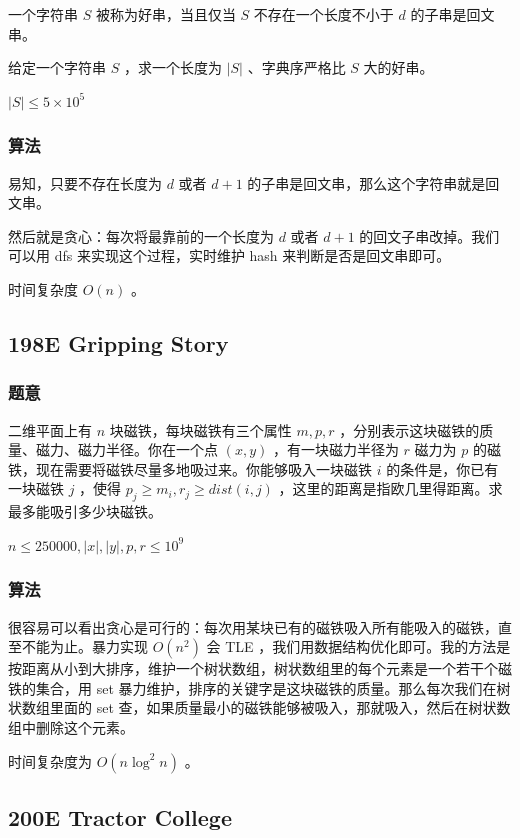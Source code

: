 \documentclass[11pt]{article}
\begin{document}
\begin{definition}
    一个字符串 $S$ 被称为好串，当且仅当 $S$ 不存在一个长度不小于 $d$ 的子串是回文串。
\end{definition}
给定一个字符串 $S$ ，求一个长度为 $|S|$ 、字典序严格比 $S$ 大的好串。

$|S| \leq 5 \times 10^5$
\subsubsection{算法}
\label{sec-11-2-2}

易知，只要不存在长度为 $d$ 或者 $d + 1$ 的子串是回文串，那么这个字符串就是回文串。

然后就是贪心：每次将最靠前的一个长度为 $d$ 或者 $d + 1$ 的回文子串改掉。我们可以用 dfs 来实现这个过程，实时维护 hash 来判断是否是回文串即可。

时间复杂度 $O(n)$ 。
    
\subsection{198E  Gripping Story}
\label{sec-11-3}
\subsubsection{题意}
\label{sec-11-3-1}

    二维平面上有 $n$ 块磁铁，每块磁铁有三个属性 $m, p, r$ ，分别表示这块磁铁的质量、磁力、磁力半径。你在一个点 $(x, y)$ ，有一块磁力半径为 $r$ 磁力为 $p$ 的磁铁，现在需要将磁铁尽量多地吸过来。你能够吸入一块磁铁 $i$ 的条件是，你已有一块磁铁 $j$ ，使得 $p_j \geq m_i, r_j \geq dist (i, j)$ ，这里的距离是指欧几里得距离。求最多能吸引多少块磁铁。

    $n \leq 250000, |x|, |y|, p, r \leq 10^9$ 
\subsubsection{算法}
\label{sec-11-3-2}

    很容易可以看出贪心是可行的：每次用某块已有的磁铁吸入所有能吸入的磁铁，直至不能为止。暴力实现 $O(n^2)$ 会 TLE ，我们用数据结构优化即可。我的方法是按距离从小到大排序，维护一个树状数组，树状数组里的每个元素是一个若干个磁铁的集合，用 set 暴力维护，排序的关键字是这块磁铁的质量。那么每次我们在树状数组里面的 set 查，如果质量最小的磁铁能够被吸入，那就吸入，然后在树状数组中删除这个元素。

    时间复杂度为 $O(n \log^2 n)$ 。
\subsection{200E  Tractor College}
\label{sec-11-4}
\end{document}

